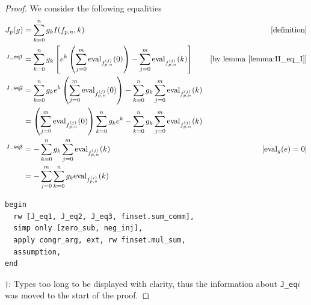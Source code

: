 \documentclass{report}
\theoremstyle{definition}
\begin{document}
\begin{proof}
We consider the following equalities
\begin{equation}\nonumber
\begin{aligned}
J_p(g)&=\sum_{k=0}^ng_k I(f_{p,n}, k) & [\text{definition}]\\
{}^{\tt J\_eq1}&=\sum_{k=0}^ng_k\left[e^k\left(\sum_{j=0}^m\mathrm{eval}_{f_{p,n}^{(j)}}(0)\right)-\sum_{j=0}^m\mathrm{eval}_{f_{p,n}^{(j)}}(k)\right] & [\text{by lemma \ref{lemma:II_eq_I}}]\\
{}^{\tt J\_eq2}&=\sum_{k=0}^ng_ke^k\left(\sum_{j=0}^m\mathrm{eval}_{f_{p,n}^{(j)}}(0)\right)-\sum_{k=0}^ng_k\sum_{j=0}^m\mathrm{eval}_{f_{p,n}^{(j)}}(k) \\
&=\left(\sum_{j=0}^m\mathrm{eval}_{f_{p,n}^{(j)}}(0)\right)\sum_{k=0}^ng_ke^k-\sum_{k=0}^ng_k\sum_{j=0}^m\mathrm{eval}_{f_{p,n}^{(j)}}(k) \\
{}^{\tt J\_eq3}&=-\sum_{k=0}^ng_k\sum_{j=0}^m\mathrm{eval}_{f_{p,n}^{(j)}}(k) & [\mathrm{eval}_g(e)=0]\\
&=-\sum_{j=0}^m\sum_{k=0}^ng_k\mathrm{eval}_{f_{p,n}^{(j)}}(k)
\end{aligned}
\end{equation}
\begin{verbatim}
begin
  rw [J_eq1, J_eq2, J_eq3, finset.sum_comm], 
  simp only [zero_sub, neg_inj],
  apply congr_arg, ext, rw finset.mul_sum,
  assumption,
end
\end{verbatim}
$\dagger$: Types too long to be displayed with clarity, thus the information about {\tt \small J\_eq$i$} was moved to the start of the proof. 
\end{proof}
\end{document}
